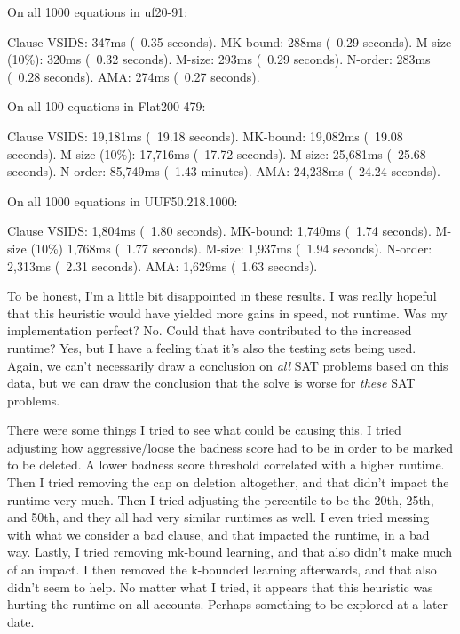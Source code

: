 \documentclass[../main.tex]{subfiles}
\begin{document}
\begin{FVerbatim}
On all 1000 equations in uf20-91:

Clause VSIDS:   347ms (~0.35 seconds).
MK-bound:       288ms (~0.29 seconds).
M-size (10\%):  320ms (~0.32 seconds).
M-size:         293ms (~0.29 seconds).
N-order:        283ms (~0.28 seconds).
AMA:            274ms (~0.27 seconds).

On all 100 equations in Flat200-479:

Clause VSIDS:   19,181ms (~19.18 seconds).
MK-bound:       19,082ms (~19.08 seconds).
M-size (10\%):  17,716ms (~17.72 seconds).
M-size:         25,681ms (~25.68 seconds).
N-order:        85,749ms (~1.43 minutes).
AMA:            24,238ms (~24.24 seconds).

On all 1000 equations in UUF50.218.1000:

Clause VSIDS:   1,804ms (~1.80 seconds).
MK-bound:       1,740ms (~1.74 seconds).
M-size (10\%)   1,768ms (~1.77 seconds).
M-size:         1,937ms (~1.94 seconds).
N-order:        2,313ms (~2.31 seconds).
AMA:            1,629ms (~1.63 seconds).
\end{FVerbatim}
\noindent
To be honest, I'm a little bit disappointed in these results. I was really hopeful 
that this heuristic would have yielded more gains in speed, not runtime. Was my 
implementation perfect? No. Could that have contributed to the increased runtime?
Yes, but I have a feeling that it's also the testing sets being used. Again, we 
can't necessarily draw a conclusion on \textit{all} SAT problems based on this 
data, but we can draw the conclusion that the solve is worse for \textit{these}
SAT problems.

There were some things I tried to see what could be causing this. I tried adjusting 
how aggressive/loose the badness score had to be in order to be marked to be deleted. 
A lower badness score threshold correlated with a higher runtime. Then I tried removing 
the cap on deletion altogether, and that didn't impact the runtime very much. Then I tried 
adjusting the percentile to be the 20th, 25th, and 50th, and they all had very similar runtimes 
as well. I even tried messing with what we consider a bad clause, and that impacted 
the runtime, in a bad way. Lastly, I tried removing mk-bound learning, and that also didn't 
make much of an impact. I then removed the k-bounded learning afterwards, and that also didn't 
seem to help. No matter what I tried, it appears that this heuristic was hurting the runtime 
on all accounts. Perhaps something to be explored at a later date.
\end{document}
